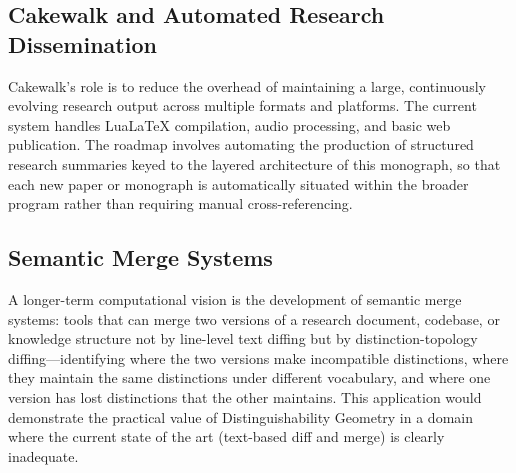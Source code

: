 \documentclass[11pt, oneside]{book}
\theoremstyle{definition}
\theoremstyle{remark}
\begin{document}
\subsection*{Cakewalk and Automated Research Dissemination}

Cakewalk's role is to reduce the overhead of maintaining a large, continuously evolving research output across multiple formats and platforms. The current system handles LuaLaTeX compilation, audio processing, and basic web publication. The roadmap involves automating the production of structured research summaries keyed to the layered architecture of this monograph, so that each new paper or monograph is automatically situated within the broader program rather than requiring manual cross-referencing.

\subsection*{Semantic Merge Systems}

A longer-term computational vision is the development of semantic merge systems: tools that can merge two versions of a research document, codebase, or knowledge structure not by line-level text diffing but by distinction-topology diffing---identifying where the two versions make incompatible distinctions, where they maintain the same distinctions under different vocabulary, and where one version has lost distinctions that the other maintains. This application would demonstrate the practical value of Distinguishability Geometry in a domain where the current state of the art (text-based diff and merge) is clearly inadequate.
\end{document}
